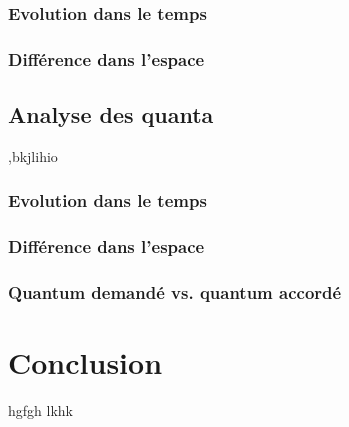 \subsubsection{Evolution dans le temps}
\subsubsection{Différence dans l'espace}

\subsection{Analyse des quanta}
,bkjlihio
\subsubsection{Evolution dans le temps}
\subsubsection{Différence dans l'espace}
\subsubsection{Quantum demandé vs. quantum accordé}

\section{Conclusion}
\label{sec:demo:conclusion}
hgfgh
lkhk